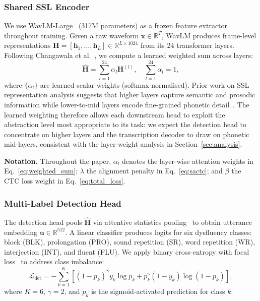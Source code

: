 \documentclass[cameraready]{Interspeech}
\begin{document}
\subsubsection{Shared SSL Encoder}

We use WavLM-Large~\cite{chen2022wavlm} (317M parameters) as a frozen feature
extractor throughout training. Given a raw waveform $\mathbf{x} \in
\mathbb{R}^T$, WavLM produces frame-level representations $\mathbf{H} =
[\mathbf{h}_1, \ldots, \mathbf{h}_L] \in \mathbb{R}^{L \times 1024}$ from its
24 transformer layers. Following Changawala et al.~\cite{changawala2024whister},
we compute a learned weighted sum across layers:
\begin{equation}
    \hat{\mathbf{H}} = \sum_{l=1}^{24} \alpha_l \mathbf{H}^{(l)},
    \quad \sum_{l=1}^{24} \alpha_l = 1,
    \label{eq:weighted_sum}
\end{equation}
where $\{\alpha_l\}$ are learned scalar weights (softmax-normalised). Prior
work on SSL representation analysis suggests that higher layers capture semantic
and prosodic information while lower-to-mid layers encode fine-grained phonetic
detail~\cite{changawala2024whister}. The learned weighting therefore allows each
downstream head to exploit the abstraction level most appropriate to its task:
we expect the detection head to concentrate on higher layers and the
transcription decoder to draw on phonetic mid-layers, consistent with
the layer-weight analysis in Section~\ref{sec:analysis}.

\noindent\textbf{Notation.} Throughout the paper, $\alpha_l$ denotes the
layer-wise attention weights in Eq.~\eqref{eq:weighted_sum}; $\lambda$ the
alignment penalty in Eq.~\eqref{eq:sactc}; and $\beta$ the CTC loss weight in
Eq.~\eqref{eq:total_loss}.

\subsubsection{Multi-Label Detection Head}

The detection head pools $\hat{\mathbf{H}}$ via attentive statistics
pooling~\cite{desplanques2020ecapa} to obtain utterance embedding $\mathbf{u}
\in \mathbb{R}^{512}$. A linear classifier produces logits for six dysfluency
classes: block (BLK), prolongation (PRO), sound repetition (SR), word
repetition (WR), interjection (INT), and fluent (FLU). We apply binary
cross-entropy with focal loss~\cite{lin2017focal} to address class imbalance:
\begin{equation}
    \mathcal{L}_{\text{det}} = -\sum_{k=1}^{K}
    \!\left[ (1-p_k)^\gamma y_k \log p_k
           + p_k^\gamma (1-y_k) \log(1-p_k) \right],
    \label{eq:focal}
\end{equation}
where $K=6$, $\gamma=2$, and $p_k$ is the sigmoid-activated prediction for
class $k$.
\end{document}
